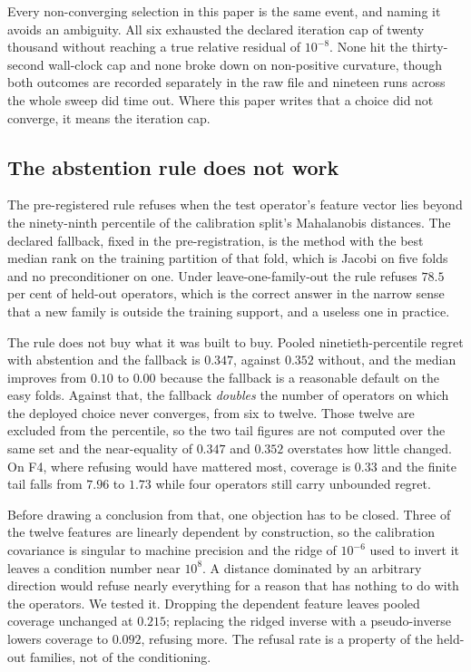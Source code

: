 \documentclass[11pt]{article}
\begin{document}
Every non-converging selection in this paper is the same event, and naming it avoids an
ambiguity. All six exhausted the declared iteration cap of twenty thousand without
reaching a true relative residual of $10^{-8}$. None hit the thirty-second wall-clock cap
and none broke down on non-positive curvature, though both outcomes are recorded
separately in the raw file and nineteen runs across the whole sweep did time out. Where
this paper writes that a choice did not converge, it means the iteration cap.

\subsection{The abstention rule does not work}
\label{sec:abstain}

The pre-registered rule refuses when the test operator's feature vector lies
beyond the ninety-ninth percentile of the calibration split's Mahalanobis
distances. The declared fallback, fixed in the
pre-registration, is the method with the best median rank on the training
partition of that fold, which is Jacobi on five folds and no preconditioner on
one. Under leave-one-family-out the rule refuses $78.5$ per cent of held-out
operators, which is the correct answer in the narrow sense that a new family is
outside the training support, and a useless one in practice.

The rule does not buy what it was built to buy. Pooled ninetieth-percentile regret
with abstention and the fallback is $0.347$, against $0.352$ without, and the
median improves from $0.10$ to $0.00$ because the fallback is a reasonable
default on the easy folds. Against that, the fallback \emph{doubles} the number
of operators on which the deployed choice never converges, from six to twelve.
Those twelve are excluded from the percentile, so the two tail figures are not
computed over the same set and the near-equality of $0.347$ and $0.352$ overstates
how little changed. On F4, where refusing would have mattered most, coverage is
$0.33$ and the finite tail falls from $7.96$ to $1.73$ while four operators still
carry unbounded regret.

Before drawing a conclusion from that, one objection has to be closed. Three of the twelve
features are linearly dependent by construction, so the calibration covariance is singular
to machine precision
and the ridge of $10^{-6}$ used to invert it leaves a condition number near $10^{8}$. A
distance dominated by an arbitrary direction would refuse nearly everything for a reason
that has nothing to do with the operators. We tested it. Dropping the dependent feature
leaves pooled coverage unchanged at $0.215$; replacing the ridged inverse with a
pseudo-inverse lowers coverage to $0.092$, refusing more. The refusal rate
is a property of the held-out families, not of the conditioning.
\end{document}
